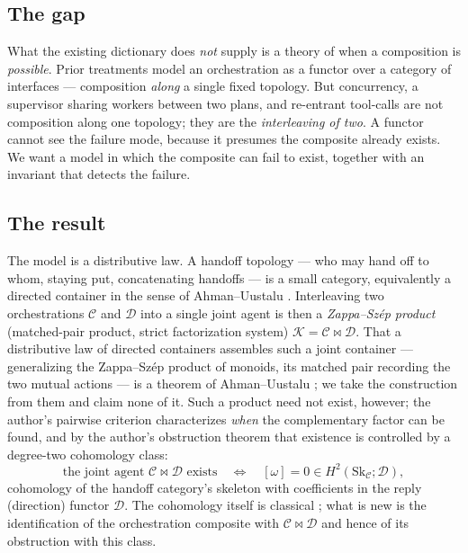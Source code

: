 \documentclass[11pt]{amsart}
\theoremstyle{definition}
\theoremstyle{remark}
\newcommand{\C}{\mathcal{C}}
\newcommand{\D}{\mathcal{D}}
\newcommand{\K}{\mathcal{K}}
\newcommand{\Sk}{\mathrm{Sk}}
\newcommand{\dir}{\mathcal{D}}
\begin{document}
\subsection*{The gap}
What the existing dictionary does \emph{not} supply is a theory of when a composition is
\emph{possible}. Prior treatments model an orchestration as a functor over a category of
interfaces --- composition \emph{along} a single fixed topology. But concurrency, a
supervisor sharing workers between two plans, and re-entrant tool-calls are not composition
along one topology; they are the \emph{interleaving of two}. A functor cannot see the
failure mode, because it presumes the composite already exists. We want a model in which the
composite can fail to exist, together with an invariant that detects the failure.

\subsection*{The result}
The model is a distributive law. A handoff topology --- who may hand off to whom, staying
put, concatenating handoffs --- is a small category, equivalently a directed container in the
sense of Ahman--Uustalu \cite{AhmanUustalu}. Interleaving two orchestrations $\C$ and $\D$
into a single joint agent is then a \emph{Zappa--Sz\'ep product} (matched-pair product,
strict factorization system) $\K=\C\bowtie\D$. That a distributive law of directed containers
assembles such a joint container --- generalizing the Zappa--Sz\'ep product of monoids, its
matched pair recording the two mutual actions --- is a theorem of Ahman--Uustalu
\cite{AhmanUustaluDL}; we take the construction from them and claim none of it. Such a product
need not exist, however; the author's pairwise criterion \cite{pairwise} characterizes
\emph{when} the complementary factor can be found, and by the author's obstruction theorem
\cite{gobstr} that existence is controlled by a degree-two cohomology class:
\[
  \text{the joint agent }\C\bowtie\D\text{ exists}
  \quad\Longleftrightarrow\quad
  [\omega]=0\in H^2(\Sk_\C;\dir),
\]
cohomology of the handoff category's skeleton with coefficients in the reply (direction)
functor $\dir$. The cohomology itself is classical
\cite{rw,baueswirsching,pirashvili}; what is new is the identification of the orchestration
composite with $\C\bowtie\D$ and hence of its obstruction with this class.
\end{document}
